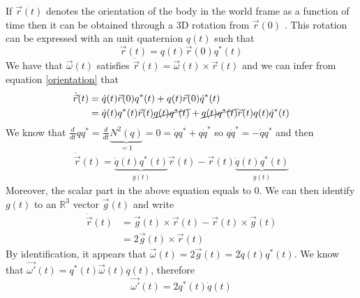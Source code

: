 \documentclass[class=report, float=false, crop=false]{standalone}
\begin{document}
If $\vec{r}(t)$ denotes the orientation of the body in the world frame as a function of time then it can be obtained through a 3D rotation from $\vec{r}(0)$ \cite{rapaport1985molecular}. This rotation can be expressed with an unit quaternion $q(t)$ such that
\begin{equation}
\boxed{\vec{r}(t) = q(t)\vec{r}(0)q^*(t)}
\label{orientation}
\end{equation}
We have that $\vec{\omega}(t)$ satisfies $\dot{\vec{r}}(t) = \vec{\omega}(t)\times\vec{r}(t)$ and we can infer from equation \ref{orientation} that
\begin{align*}
\dot{\vec{r}}(t) &= \dot{q}(t)\vec{r}(0)q^*(t) + q(t)\vec{r}(0)\dot{q}^*(t)\\
&= \dot{q}(t)q^*(t)\vec{r}(t)\cancel{q(t)q^*(t)} + \cancel{q(t)q^*(t)}\vec{r}(t)q(t)\dot{q}^*(t)
\end{align*}
We know that $\frac{d}{dt} qq^* = \frac{d}{dt} \underbrace{N^2(q)}_{=1} = 0 = \dot{q}q^* + q\dot{q}^*$ so $q\dot{q}^* = - \dot{q}q^*$ and then
\begin{align*}
\dot{\vec{r}}(t) = \underbrace{\dot{q}(t)q^*(t)}_{g(t)}\vec{r}(t) - \vec{r}(t)\underbrace{\dot{q}(t)q^*(t)}_{g(t)}
\end{align*}
Moreover, the scalar part in the above equation equals to 0. We can then identify $g(t)$ to an $\mathbb{R}^3$ vector $\vec{g}(t)$ and write
\begin{align*}
\dot{\vec{r}}(t) &= \vec{g}(t)\times\vec{r}(t) - \vec{r}(t)\times\vec{g}(t)\\
&= 2\vec{g}(t)\times\vec{r}(t)
\end{align*}
By identification, it appears that $\vec{\omega}(t) = 2\vec{g}(t) = 2\dot{q}(t)q^*(t)$. We know that $\vec{\omega'}(t) = q^*(t)\vec{\omega}(t)q(t)$, therefore
\begin{equation}
\boxed{\vec{\omega'}(t) = 2q^*(t)\dot{q}(t)}
\label{omega}
\end{equation}
\end{document}

